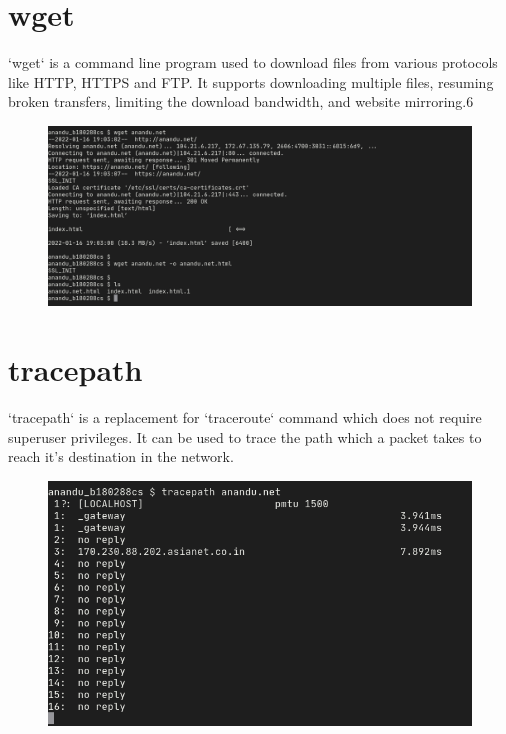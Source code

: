 \documentclass{article}
\begin{document}
\section{wget}
`wget` is a command line program used to download files from various protocols like HTTP, HTTPS and FTP. It supports downloading multiple files, resuming broken transfers, limiting the download bandwidth, and website mirroring.6
\begin{figure}[ht]
    \centering
    \includegraphics[width=1.0\textwidth]{images/wget.png}
\end{figure}
\pagebreak

\section{tracepath}
`tracepath` is a replacement for `traceroute` command which does not require superuser privileges. It can be used to trace the path which a packet takes to reach it's destination in the network.
\begin{figure}[ht]
    \centering
    \includegraphics[width=1.0\textwidth]{images/tracepath.png}
\end{figure}
\pagebreak
\end{document}

